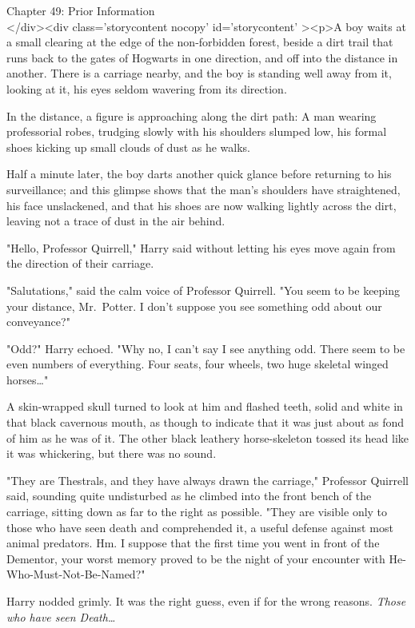 
Chapter 49: Prior Information\\
</div><div  class='storycontent nocopy' id='storycontent' ><p>A boy waits at a small clearing at the edge of the non-forbidden forest, beside a dirt trail that runs back to the gates of Hogwarts in one direction, and off into the distance in another. There is a carriage nearby, and the boy is standing well away from it, looking at it, his eyes seldom wavering from its direction.

In the distance, a figure is approaching along the dirt path: A man wearing professorial robes, trudging slowly with his shoulders slumped low, his formal shoes kicking up small clouds of dust as he walks.

Half a minute later, the boy darts another quick glance before returning to his surveillance; and this glimpse shows that the man's shoulders have straightened, his face unslackened, and that his shoes are now walking lightly across the dirt, leaving not a trace of dust in the air behind.

"Hello, Professor Quirrell," Harry said without letting his eyes move again from the direction of their carriage.

"Salutations," said the calm voice of Professor Quirrell. "You seem to be keeping your distance, Mr.~Potter. I don't suppose you see something odd about our conveyance?"

"Odd?" Harry echoed. "Why no, I can't say I see anything odd. There seem to be even numbers of everything. Four seats, four wheels, two huge skeletal winged horses{\ldots}"

A skin-wrapped skull turned to look at him and flashed teeth, solid and white in that black cavernous mouth, as though to indicate that it was just about as fond of him as he was of it. The other black leathery horse-skeleton tossed its head like it was whickering, but there was no sound.

"They are Thestrals, and they have always drawn the carriage," Professor Quirrell said, sounding quite undisturbed as he climbed into the front bench of the carriage, sitting down as far to the right as possible. "They are visible only to those who have seen death and comprehended it, a useful defense against most animal predators. Hm. I suppose that the first time you went in front of the Dementor, your worst memory proved to be the night of your encounter with He-Who-Must-Not-Be-Named?"

Harry nodded grimly. It was the right guess, even if for the wrong reasons. \emph{Those who have seen Death{\ldots}}

